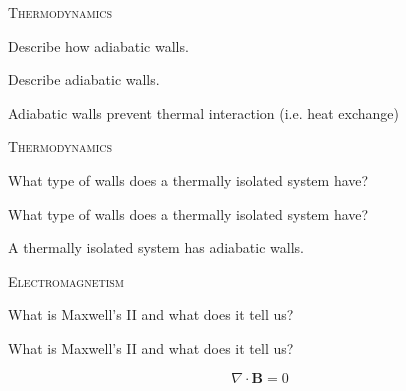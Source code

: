 \documentclass{article}
\newenvironment{flashcard}[2][]{%
\noindent  \textsc{#1}

\vfill
\centerline{{\Large{#2}}}
\vfill
\newpage
}
{\newpage}
\begin{document}

\begin{flashcard}[Thermodynamics]{Describe how adiabatic walls.}

Describe adiabatic walls.

Adiabatic walls prevent thermal interaction (i.e. heat exchange) 
\end{flashcard}


\begin{flashcard}[Thermodynamics]{What type of walls does a thermally isolated system have?}

What type of walls does a thermally
 isolated system have?

A thermally isolated system has adiabatic walls.
\end{flashcard}



\begin{flashcard}[Electromagnetism]{What is Maxwell's II and what does it tell us?}

What is Maxwell's II and what does it tell us?

$$\nabla \cdot \mathbf{B} = 0$$
\end{flashcard}
\end{document}
